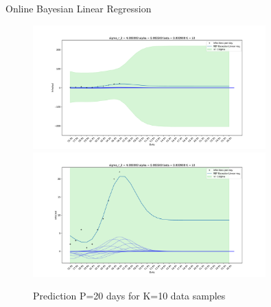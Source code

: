 \documentclass[english]{exercisesheet}
\begin{document}
\begin{nexercise}{Online Bayesian Linear Regression}
\begin{solution}
        \begin{figure}
        \includegraphics[width=0.8\textwidth]{3.pdf}
        \includegraphics[width=0.8\textwidth]{4.pdf}
        \caption{Prediction P=20 days for K=10 data samples}
        

\end{figure}
\end{solution}
\end{nexercise}
\end{document}
